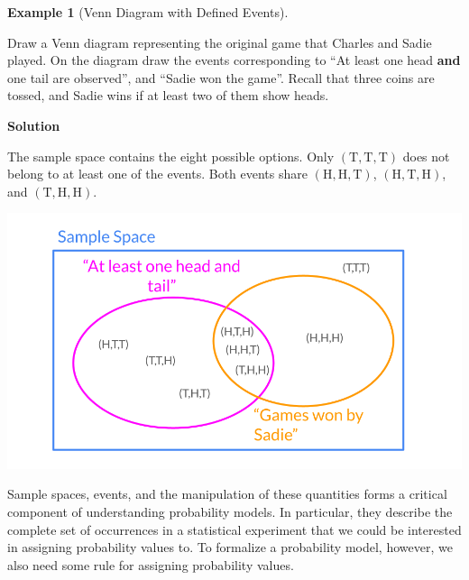 \documentclass[
  letterpaper,
  DIV=11,
  numbers=noendperiod]{scrreprt}
\theoremstyle{definition}
\theoremstyle{definition}
\newtheorem{example}{Example}[chapter]
\theoremstyle{definition}
\theoremstyle{remark}
\begin{document}
\begin{example}[Venn Diagram with Defined
Events]\protect\hypertarget{exm-charles-and-sadie-vd}{}\label{exm-charles-and-sadie-vd}

Draw a Venn diagram representing the original game that Charles and
Sadie played. On the diagram draw the events corresponding to ``At least
one head \textbf{and} one tail are observed'', and ``Sadie won the
game''. Recall that three coins are tossed, and Sadie wins if at least
two of them show heads.

\begin{tcolorbox}[enhanced jigsaw, colback=white, colframe=quarto-callout-color-frame, arc=.35mm, leftrule=.75mm, rightrule=.15mm, opacityback=0, breakable, bottomrule=.15mm, left=2mm, toprule=.15mm]

\vspace{-3mm}\textbf{Solution}\vspace{3mm}

The sample space contains the eight possible options. Only
\((\text{T}, \text{T}, \text{T})\) does not belong to at least one of
the events. Both events share \((\text{H},\text{H},\text{T})\),
\((\text{H},\text{T},\text{H})\), and \((\text{T},\text{H},\text{H})\).

\includegraphics{graphics/ch2-venn-diagram-example.png}

\end{tcolorbox}

\end{example}

Sample spaces, events, and the manipulation of these quantities forms a
critical component of understanding probability models. In particular,
they describe the complete set of occurrences in a statistical
experiment that we could be interested in assigning probability values
to. To formalize a probability model, however, we also need some rule
for assigning probability values.
\end{document}
